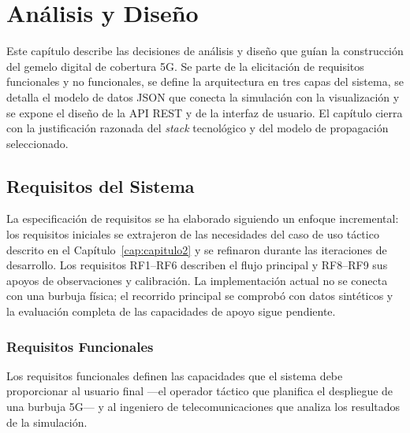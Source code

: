 \chapter{Análisis y Diseño}
\label{cap:capitulo3}

Este capítulo describe las decisiones de análisis y diseño que guían la construcción del
gemelo digital de cobertura 5G. Se parte de la elicitación de requisitos funcionales y no
funcionales, se define la arquitectura en tres capas del sistema, se detalla el modelo de
datos JSON que conecta la simulación con la visualización y se expone el diseño de la API
REST y de la interfaz de usuario. El capítulo cierra con la justificación razonada del
\textit{stack} tecnológico y del modelo de propagación seleccionado.

\section{Requisitos del Sistema}
\label{sec:requisitos}

La especificación de requisitos se ha elaborado siguiendo un enfoque incremental: los
requisitos iniciales se extrajeron de las necesidades del caso de uso táctico descrito en
el Capítulo~\ref{cap:capitulo2} y se refinaron durante las iteraciones de desarrollo. Los
requisitos RF1--RF6 describen el flujo principal y RF8--RF9 sus apoyos de observaciones
y calibración. La implementación actual no se conecta con una burbuja física; el
recorrido principal se comprobó con datos sintéticos y la evaluación completa de
las capacidades de apoyo sigue pendiente.

\subsection{Requisitos Funcionales}
\label{subsec:req_func}

Los requisitos funcionales definen las capacidades que el sistema debe proporcionar al
usuario final ---el operador táctico que planifica el despliegue de una burbuja 5G--- y al
ingeniero de telecomunicaciones que analiza los resultados de la simulación.

